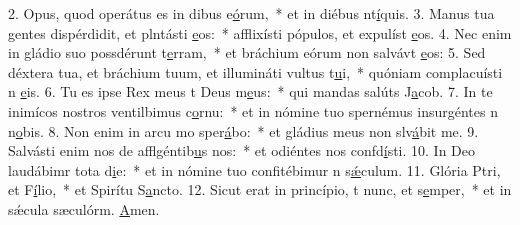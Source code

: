 2. Opus, quod operátus es in dibus e\uline{ó}rum,~* et in diébus nt\uline{í}quis.
3. Manus tua gentes dispérdidit, et plntásti \uline{e}os:~* afflixísti pópulos, et expulíst \uline{e}os.
4. Nec enim in gládio suo possdérunt t\uline{e}rram,~* et bráchium eórum non salvávt \uline{e}os:
5. Sed déxtera tua, et bráchium tuum, et illumináti vultus t\uline{u}i,~* quóniam complacuísti n \uline{e}is.
6. Tu es ipse Rex meus t Deus m\uline{e}us:~* qui mandas salúts J\uline{a}cob.
7. In te inimícos nostros ventilbimus c\uline{o}rnu:~* et in nómine tuo spernémus insurgéntes n n\uline{o}bis.
8. Non enim in arcu mo sper\uline{á}bo:~* et gládius meus non slv\uline{á}bit me.
9. Salvásti enim nos de afflgéntib\uline{u}s nos:~* et odiéntes nos confd\uline{í}sti.
10. In Deo laudábimr tota d\uline{i}e:~* et in nómine tuo confitébimur n s\uline{ǽ}culum.
11. Glória Ptri, et F\uline{í}lio,~* et Spirítu S\uline{a}ncto.
12. Sicut erat in princípio, t nunc, et s\uline{e}mper,~* et in sǽcula sæculórm. \uline{A}men.
